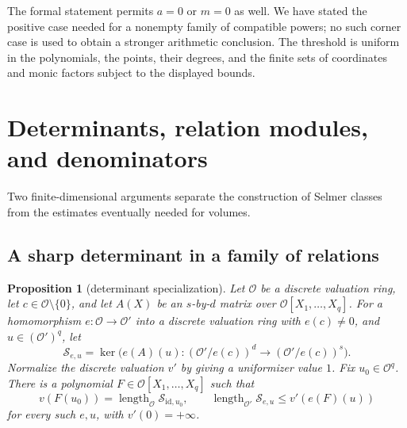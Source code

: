 \documentclass[11pt,a4paper]{article}
\newtheorem{proposition}[theorem]{Proposition}
\theoremstyle{definition}
\newcommand{\length}{\operatorname{length}}
\begin{document}
The formal statement permits \(a=0\) or \(m=0\) as well. We have stated the
positive case needed for a nonempty family of compatible powers; no such
corner case is used to obtain a stronger arithmetic conclusion.
The threshold is uniform in the polynomials, the points, their degrees, and
the finite sets of coordinates and monic factors subject to the displayed bounds.


\section{Determinants, relation modules, and denominators}\label{sec:denominators}
Two finite-dimensional arguments separate the construction of Selmer classes
from the estimates eventually needed for volumes.

\subsection{A sharp determinant in a family of relations}
\begin{proposition}[determinant specialization]\label{prop:fitting}
Let \(\mathcal O\) be a discrete valuation ring, let \(c\in\mathcal O\setminus\{0\}\),
and let \(A(X)\) be an \(s\)-by-\(d\) matrix over
\(\mathcal O[X_1,\ldots,X_q]\).
For a homomorphism \(e:\mathcal O\to\mathcal O'\) into a discrete valuation ring
with \(e(c)\ne0\), and \(u\in(\mathcal O')^q\), let
\[
 \mathcal S_{e,u}
 =\ker\bigl(e(A)(u):(\mathcal O'/e(c))^d
                         \longrightarrow(\mathcal O'/e(c))^s\bigr).
\]
Normalize the discrete valuation \(v'\) by giving a uniformizer value \(1\).
Fix \(u_0\in\mathcal O^q\). There is a polynomial
\(F\in\mathcal O[X_1,\ldots,X_q]\) such that
\[
 v(F(u_0))=\length_{\mathcal O}\mathcal S_{\mathrm{id},u_0},
 \qquad
 \length_{\mathcal O'}\mathcal S_{e,u}
                  \le v'(e(F)(u))
\]
for every such \(e,u\), with \(v'(0)=+\infty\).
\end{proposition}
\end{document}
